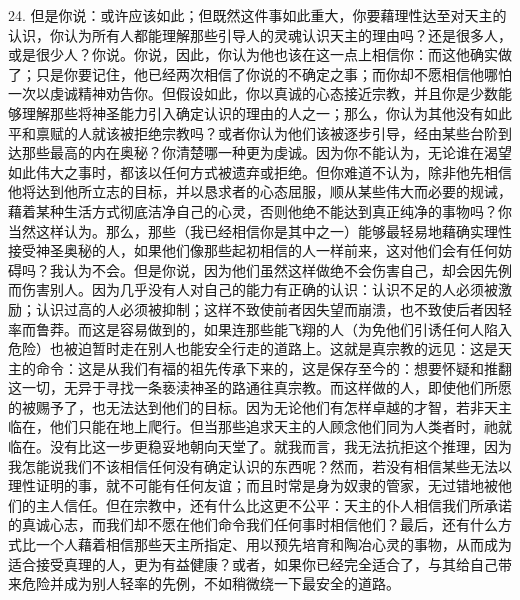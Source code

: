 24. 但是你说：或许应该如此；但既然这件事如此重大，你要藉理性达至对天主的认识，你认为所有人都能理解那些引导人的灵魂认识天主的理由吗？还是很多人，或是很少人？你说。你说，因此，你认为他也该在这一点上相信你：而这他确实做了；只是你要记住，他已经两次相信了你说的不确定之事；而你却不愿相信他哪怕一次以虔诚精神劝告你。但假设如此，你以真诚的心态接近宗教，并且你是少数能够理解那些将神圣能力引入确定认识的理由的人之一；那么，你认为其他没有如此平和禀赋的人就该被拒绝宗教吗？或者你认为他们该被逐步引导，经由某些台阶到达那些最高的内在奥秘？你清楚哪一种更为虔诚。因为你不能认为，无论谁在渴望如此伟大之事时，都该以任何方式被遗弃或拒绝。但你难道不认为，除非他先相信他将达到他所立志的目标，并以恳求者的心态屈服，顺从某些伟大而必要的规诫，藉着某种生活方式彻底洁净自己的心灵，否则他绝不能达到真正纯净的事物吗？你当然这样认为。那么，那些（我已经相信你是其中之一）能够最轻易地藉确实理性接受神圣奥秘的人，如果他们像那些起初相信的人一样前来，这对他们会有任何妨碍吗？我认为不会。但是你说，因为他们虽然这样做绝不会伤害自己，却会因先例而伤害别人。因为几乎没有人对自己的能力有正确的认识：认识不足的人必须被激励；认识过高的人必须被抑制；这样不致使前者因失望而崩溃，也不致使后者因轻率而鲁莽。而这是容易做到的，如果连那些能飞翔的人（为免他们引诱任何人陷入危险）也被迫暂时走在别人也能安全行走的道路上。这就是真宗教的远见：这是天主的命令：这是从我们有福的祖先传承下来的，这是保存至今的：想要怀疑和推翻这一切，无异于寻找一条亵渎神圣的路通往真宗教。而这样做的人，即使他们所愿的被赐予了，也无法达到他们的目标。因为无论他们有怎样卓越的才智，若非天主临在，他们只能在地上爬行。但当那些追求天主的人顾念他们同为人类者时，祂就临在。没有比这一步更稳妥地朝向天堂了。就我而言，我无法抗拒这个推理，因为我怎能说我们不该相信任何没有确定认识的东西呢？然而，若没有相信某些无法以理性证明的事，就不可能有任何友谊；而且时常是身为奴隶的管家，无过错地被他们的主人信任。但在宗教中，还有什么比这更不公平：天主的仆人相信我们所承诺的真诚心志，而我们却不愿在他们命令我们任何事时相信他们？最后，还有什么方式比一个人藉着相信那些天主所指定、用以预先培育和陶冶心灵的事物，从而成为适合接受真理的人，更为有益健康？或者，如果你已经完全适合了，与其给自己带来危险并成为别人轻率的先例，不如稍微绕一下最安全的道路。\par

